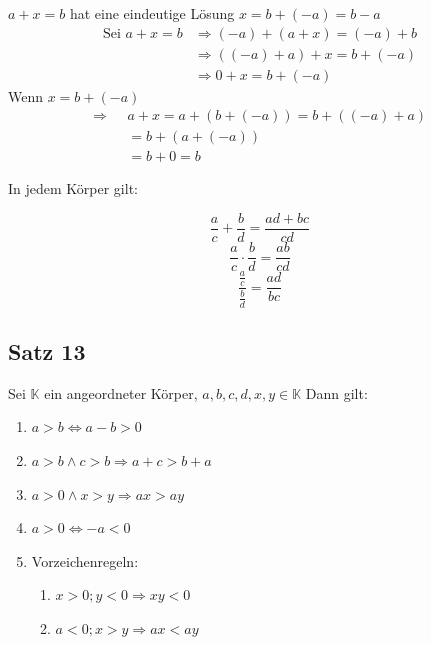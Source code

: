 \documentclass[fleqn]{scrbook}
\newenvironment{example}{{\bfseries Beispiel }}{}
\begin{document}
\begin{example}
  $a+x=b$ hat eine eindeutige Lösung
  $x=b+(-a)=b-a$
  \begin{align*}
    \text{Sei } a+x=b & \Longrightarrow (-a)+(a+x)=(-a)+b\\
		      & \Longrightarrow ((-a)+a)+x=b+(-a)\\
		      & \Longrightarrow 0 + x = b+ (-a)
  \end{align*}
  Wenn $x=b+(-a)$
  \begin{align*}
    \Longrightarrow \text{ } & a+x=a+(b+(-a))=b+((-a)+a)\\
			    & = b+(a+(-a))\\
			    & =b+0=b
  \end{align*}
\end{example}

In jedem Körper gilt:

\[\frac{a}{c}+\frac{b}{d}=\frac{ad+bc}{cd}\]
\[\frac{a}{c} \cdot \frac{b}{d}=\frac{ab}{cd}\]
\[\frac{\frac{a}{c}}{\frac{b}{d}}=\frac{ad}{bc}\]


\subsection{Satz 13}

Sei $\mathbb{K}$ ein angeordneter Körper, $a,b,c,d,x,y \in \mathbb{K}$ Dann gilt:

\begin{enumerate}
  \item $a>b \Longleftrightarrow a-b>0$
  \item $a>b \wedge c>b \Longrightarrow a+c>b+a$
  \item $a>0 \wedge x > y \Longrightarrow ax>ay$
  \item $a>0 \Longleftrightarrow -a<0$
  \item Vorzeichenregeln:
  \begin{enumerate}
    \item $x>0;y<0 \Longrightarrow xy <0$
    \item $a<0; x>y \Longrightarrow ax < ay$
  \end{enumerate}
\end{enumerate}

\pagebreak
\end{document}
